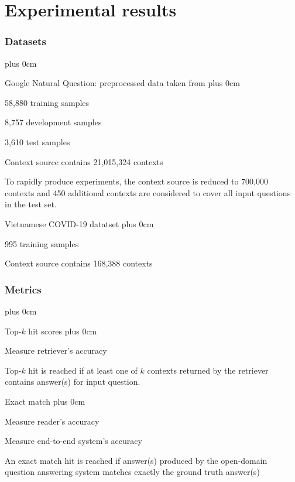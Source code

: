 \documentclass[11pt]{beamer}
\renewcommand{\raggedright}{\leftskip=0pt \rightskip=0pt plus 0cm}
\let\olditemize=\itemize
\renewenvironment{itemize}{\olditemize\raggedright}{\endlist}
\begin{document}
\section{Experimental results}
\begin{frame}
\frametitle{Datasets}
\begin{itemize}
	\item Google Natural Question: preprocessed data taken from \cite{dpr}
	\begin{itemize}
		\item 58,880 training samples
		\item 8,757 development samples
		\item 3,610 test samples
		\item Context source contains 21,015,324 contexts
		\item To rapidly produce experiments, the context source is reduced to 700,000 contexts and 450 additional contexts are considered to cover all input questions in the test set. 
	\end{itemize}
	\item Vietnamese COVID-19 datatset
	\begin{itemize}
		\item 995 training samples
		\item Context source contains 168,388 contexts
	\end{itemize}
\end{itemize}
\end{frame}
\begin{frame}
\frametitle{Metrics}
\begin{itemize}
	\item Top-$k$ hit scores
	\begin{itemize}
		\item Measure retriever's accuracy
		\item Top-$k$ hit is reached if at least one of $k$ contexts returned by the retriever contains answer(s) for input question. 
	\end{itemize}
	\item Exact match
	\begin{itemize}
		\item Measure reader's accuracy
		\item Measure end-to-end system's accuracy
		\item An exact match hit is reached if answer(s) produced by the open-domain question answering system matches exactly the ground truth answer(s)
	\end{itemize}
\end{itemize}
\end{frame}
\end{document}
